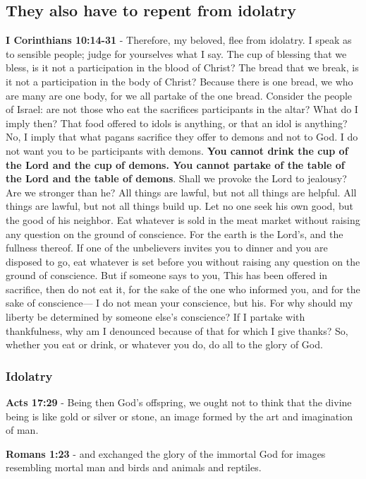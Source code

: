 \documentclass[11pt]{article}
\begin{document}
\subsection{They also have to repent from idolatry}
\label{sec:org263ecec}
\textbf{I Corinthians 10:14-31} - Therefore, my beloved, flee from idolatry. I speak as to sensible people; judge for yourselves what I say. The cup of blessing that we bless, is it not a participation in the blood of Christ? The bread that we break, is it not a participation in the body of Christ? Because there is one bread, we who are many are one body, for we all partake of the one bread. Consider the people of Israel: are not those who eat the sacrifices participants in the altar? What do I imply then? That food offered to idols is anything, or that an idol is anything? No, I imply that what pagans sacrifice they offer to demons and not to God. I do not want you to be participants with demons. \textbf{You cannot drink the cup of the Lord and the cup of demons. You cannot partake of the table of the Lord and the table of demons}. Shall we provoke the Lord to jealousy? Are we stronger than he? All things are lawful, but not all things are helpful. All things are lawful, but not all things build up. Let no one seek his own good, but the good of his neighbor. Eat whatever is sold in the meat market without raising any question on the ground of conscience. For the earth is the Lord's, and the fullness thereof. If one of the unbelievers invites you to dinner and you are disposed to go, eat whatever is set before you without raising any question on the ground of conscience. But if someone says to you, This has been offered in sacrifice, then do not eat it, for the sake of the one who informed you, and for the sake of conscience— I do not mean your conscience, but his. For why should my liberty be determined by someone else's conscience? If I partake with thankfulness, why am I denounced because of that for which I give thanks? So, whether you eat or drink, or whatever you do, do all to the glory of God.

\subsubsection{Idolatry}
\label{sec:org51e5ee0}

\textbf{Acts 17:29} - Being then God's offspring, we ought not to think that the divine being is like gold or silver or stone, an image formed by the art and imagination of man.

\textbf{Romans 1:23} - and exchanged the glory of the immortal God for images resembling mortal man and birds and animals and reptiles.􄐺
\end{document}
